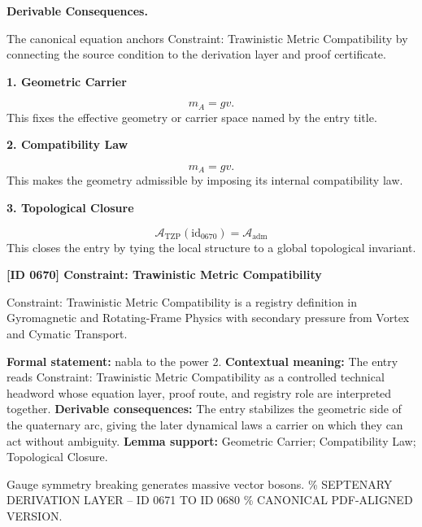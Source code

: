 \par\vspace{0.35em}
\noindent\textbf{Derivable Consequences.}\quad
\begingroup
\footnotesize
\raggedright
The canonical equation anchors Constraint: Trawinistic Metric Compatibility by connecting the source condition to the derivation layer and proof certificate.
\par\endgroup

\noindent\textbf{1. Geometric Carrier}\par
\[
m_A = gv.
\]
\noindent This fixes the effective geometry or carrier space named by the entry title.\par
\noindent\textbf{2. Compatibility Law}\par
\[
\boxed{ m_A = gv. }
\]
\noindent This makes the geometry admissible by imposing its internal compatibility law.\par
\noindent\textbf{3. Topological Closure}\par
\[
\mathcal{A}_{\mathrm{TZP}}(\mathrm{id}_{0670})=\mathcal{A}_{\mathrm{adm}}
\]
\noindent This closes the entry by tying the local structure to a global topological invariant.\par

\clearpage
\noindent\textbf{[ID 0670] Constraint: Trawinistic Metric Compatibility}\par
\vspace{0.35em}
\begingroup\small
{}
Constraint: Trawinistic Metric Compatibility is a registry definition in Gyromagnetic and Rotating-Frame Physics with secondary pressure from Vortex and Cymatic Transport.

\begingroup\footnotesize\setlength{\emergencystretch}{3em}\sloppy
\textbf{Formal statement:} nabla to the power 2. \textbf{Contextual meaning:} The entry reads Constraint: Trawinistic Metric Compatibility as a controlled technical headword whose equation layer, proof route, and registry role are interpreted together. \textbf{Derivable consequences:} The entry stabilizes the geometric side of the quaternary arc, giving the later dynamical laws a carrier on which they can act without ambiguity. \textbf{Lemma support:} Geometric Carrier; Compatibility Law; Topological Closure.\par
\endgroup

Gauge symmetry breaking generates massive vector bosons. \% SEPTENARY DERIVATION LAYER -- ID 0671 TO ID 0680 \% CANONICAL PDF-ALIGNED VERSION.

